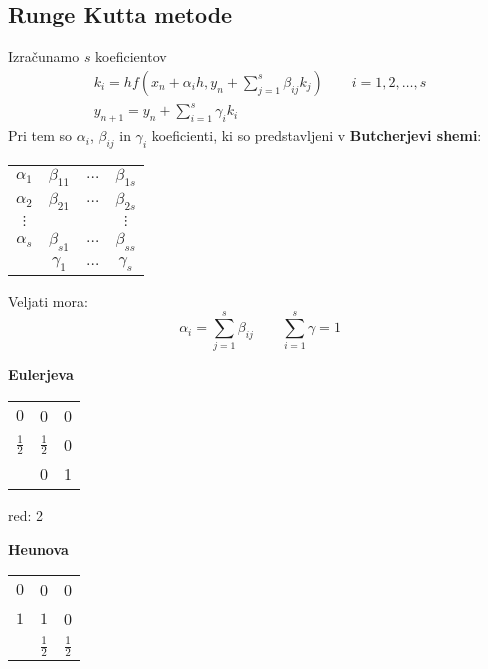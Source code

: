 \begin{multicols}{5}
\subsection*{Runge Kutta metode}
Izračunamo $s$ koeficientov
\begin{gather*}
    k_i = hf(x_n + \alpha_i h, y_n + \sum_{j=1}^s \beta_{ij} k_j) \qquad i = 1, 2, \dots, s \\
    y_{n+1} = y_n + \sum_{i=1}^s \gamma_i k_i
\end{gather*}
Pri tem so $\alpha_i$, $\beta_{ij}$ in $\gamma_i$ koeficienti, ki so predstavljeni v \textbf{Butcherjevi shemi}:
\begin{center}
    \begin{tabular}[]{c | c c c}
        $\alpha_1$ & $\beta_{11}$ & $\dots$ & $\beta_{1s}$ \\
        $\alpha_2$ & $\beta_{21}$ & $\dots$ & $\beta_{2s}$ \\
        $\vdots$ &                &         & $\vdots$ \\
        $\alpha_s$ & $\beta_{s1}$ & $\dots$ & $\beta_{ss}$ \\ \hline
                 & $\gamma_{1}$ & $\dots$ & $\gamma_{s}$ \\

    \end{tabular}
\end{center}
Veljati mora:
\[\alpha_i = \sum_{j=1}^{s} \beta_{ij} \qquad \sum_{i=1}^s \gamma = 1\]

\begin{multicols*}{3}
    
    \textbf{Eulerjeva}
    \begin{center}
        \renewcommand{\arraystretch}{1.5}
        \begin{tabular}[]{c | c c}
            $0$ & 0 & 0 \\
            $\frac{1}{2}$ & $\frac{1}{2}$ & 0 \\ \hline
            & 0 & 1 \\
            
        \end{tabular}
    \end{center}
    red: 2

    \textbf{Heunova}
    \begin{center}
        \renewcommand{\arraystretch}{1.5}
        \begin{tabular}[]{c | c c}
            $0$ & 0 & 0 \\
            $1$ & $1$ & 0 \\ \hline
            & $\frac{1}{2}$ & $\frac{1}{2}$ \\
            

\end{tabular}
\end{center}
\end{multicols*}
\end{multicols}
